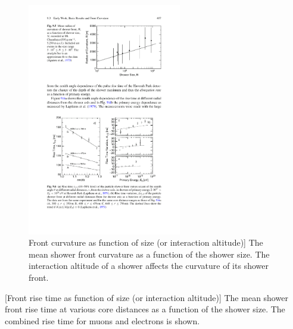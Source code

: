 \begin{figure}
    \centering
    \includegraphics[width=0.6\textwidth]
                    {plots/cosmic-rays/curvature_front}
    \caption{Front curvature as function of size (or interaction altitude)]
The mean shower front curvature as a function of the shower size. The interaction altitude of a shower affects the curvature of its shower front.}
    \label{fig:curvature_front}
\end{figure}

[Front rise time as function of size (or interaction altitude)]
The mean shower front rise time at various core distances as a function of the shower size. The combined rise time for muons and electrons is shown.
